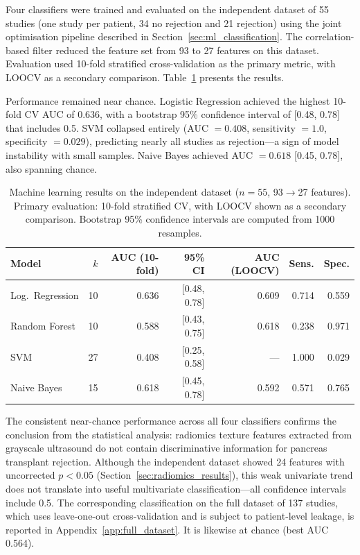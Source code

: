 Four classifiers were trained and evaluated on the independent dataset of 55 studies (one study per patient, 34 no rejection and 21 rejection) using the joint optimisation pipeline described in Section~\ref{sec:ml_classification}. The correlation-based filter reduced the feature set from 93 to 27 features on this dataset. Evaluation used 10-fold stratified cross-validation as the primary metric, with LOOCV as a secondary comparison. Table~\ref{tab:ml_independent} presents the results.

Performance remained near chance. Logistic Regression achieved the highest 10-fold CV AUC of 0.636, with a bootstrap 95\% confidence interval of [0.48, 0.78] that includes 0.5. SVM collapsed entirely (AUC $= 0.408$, sensitivity $= 1.0$, specificity $= 0.029$), predicting nearly all studies as rejection---a sign of model instability with small samples. Naive Bayes achieved AUC $= 0.618$ [0.45, 0.78], also spanning chance.

\begin{table}[ht]
\centering
\caption{Machine learning results on the independent dataset ($n = 55$, 93$\to$27 features). Primary evaluation: 10-fold stratified CV, with LOOCV shown as a secondary comparison. Bootstrap 95\% confidence intervals are computed from 1000 resamples.}
\label{tab:ml_independent}
\begin{tabular}{lrrrrrr}
\toprule
Model & $k$ & AUC (10-fold) & 95\% CI & AUC (LOOCV) & Sens. & Spec. \\
\midrule
Log.\ Regression & 10 & 0.636 & [0.48, 0.78] & 0.609 & 0.714 & 0.559 \\
Random Forest & 10 & 0.588 & [0.43, 0.75] & 0.618 & 0.238 & 0.971 \\
SVM & 27 & 0.408 & [0.25, 0.58] & --- & 1.000 & 0.029 \\
Naive Bayes & 15 & 0.618 & [0.45, 0.78] & 0.592 & 0.571 & 0.765 \\
\bottomrule
\end{tabular}
\end{table}

The consistent near-chance performance across all four classifiers confirms the conclusion from the statistical analysis: radiomics texture features extracted from grayscale ultrasound do not contain discriminative information for pancreas transplant rejection. Although the independent dataset showed 24 features with uncorrected $p < 0.05$ (Section~\ref{sec:radiomics_results}), this weak univariate trend does not translate into useful multivariate classification---all confidence intervals include 0.5. The corresponding classification on the full dataset of 137 studies, which uses leave-one-out cross-validation and is subject to patient-level leakage, is reported in Appendix~\ref{app:full_dataset}. It is likewise at chance (best AUC 0.564).

